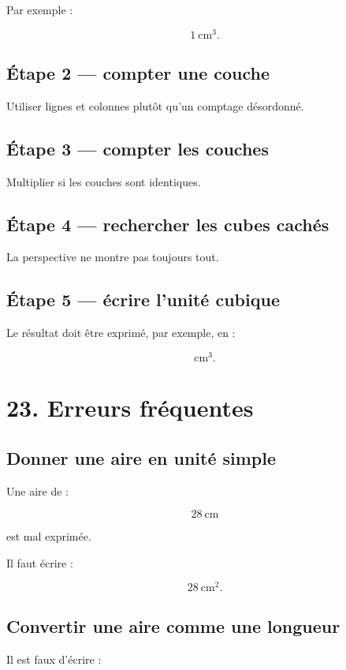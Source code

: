 Par exemple :

\[
1\ \text{cm}^3.
\]

\subsection{Étape 2 — compter une couche}

Utiliser lignes et colonnes plutôt qu’un comptage désordonné.

\subsection{Étape 3 — compter les couches}

Multiplier si les couches sont identiques.

\subsection{Étape 4 — rechercher les cubes cachés}

La perspective ne montre pas toujours tout.

\subsection{Étape 5 — écrire l’unité cubique}

Le résultat doit être exprimé, par exemple, en :

\[
\text{cm}^3.
\]

\section{23. Erreurs fréquentes}

\subsection{Donner une aire en unité simple}

Une aire de :

\[
28\ \text{cm}
\]

est mal exprimée.

Il faut écrire :

\[
28\ \text{cm}^2.
\]

\subsection{Convertir une aire comme une longueur}

Il est faux d’écrire :

